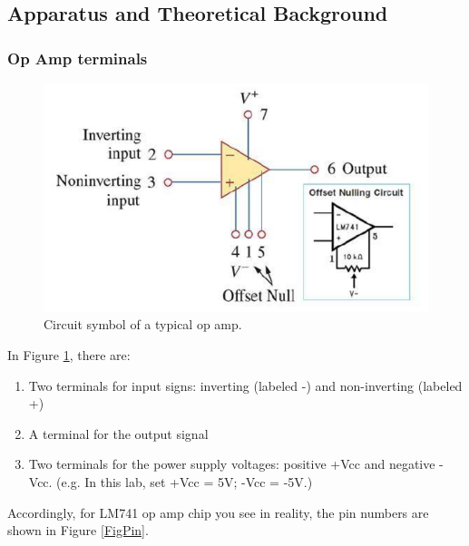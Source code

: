 \documentclass{article}
\begin{document}
	\subsection{Apparatus and Theoretical Background}
\subsubsection{Op Amp terminals}
\begin{figure}[H]
\centering
\includegraphics[scale=1.0]{opamp.png}
\caption{Circuit symbol of a typical op amp.}\label{FigOpAmp}
\end{figure}

In Figure \ref{FigOpAmp}, there are:
\begin{enumerate}
\item Two terminals for input signs: inverting (labeled -) and non-inverting (labeled +)
\item A terminal for the output signal
\item Two terminals for the power supply voltages: positive +Vcc and negative -Vcc. (e.g. In this lab, set +Vcc = 5V; -Vcc = -5V.)
\end{enumerate}

Accordingly, for LM741 op amp chip you see in reality, the pin numbers are shown in Figure \ref{FigPin}.
\end{document}
